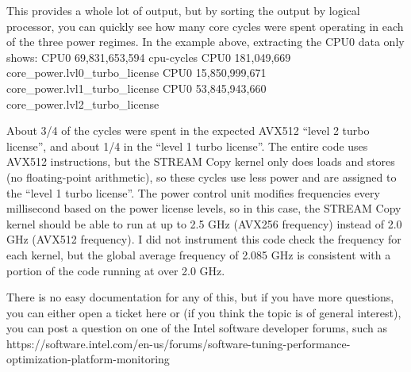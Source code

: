 This provides a whole lot of output, but by sorting the output by
logical processor, you can quickly see how many core cycles were spent
operating in each of the three power regimes. In the example above,
extracting the CPU0 data only shows:
CPU0 69,831,653,594 cpu-cycles
CPU0 181,049,669 core_power.lvl0_turbo_license
CPU0 15,850,999,671 core_power.lvl1_turbo_license
CPU0 53,845,943,660 core_power.lvl2_turbo_license

About 3/4 of the cycles were spent in the expected AVX512 ``level 2
turbo license'', and about 1/4 in the ``level 1 turbo license''.
The entire code uses AVX512 instructions, but the STREAM Copy kernel
only does loads and stores (no floating-point arithmetic), so these
cycles use less power and are assigned to the ``level 1 turbo
license''. The power control unit modifies frequencies every
millisecond based on the power license levels, so in this case, the
STREAM Copy kernel should be able to run at up to 2.5 GHz (AVX256
frequency) instead of 2.0 GHz (AVX512 frequency). I did not instrument
this code check the frequency for each kernel, but the global average
frequency of 2.085 GHz is consistent with a portion of the code
running at over 2.0 GHz.

There is no easy documentation for any of this, but if you have more
questions, you can either open a ticket here or (if you think the
topic is of general interest), you can post a question on one of the
Intel software developer forums, such as
https://software.intel.com/en-us/forums/software-tuning-performance-optimization-platform-monitoring
